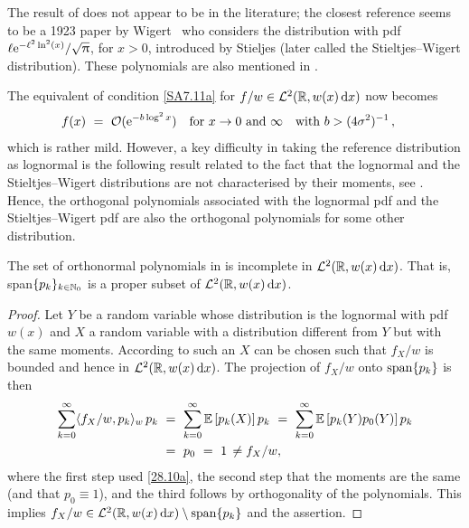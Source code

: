 \begin{remark}\label{Rem:27.10b}
The result of 
does not appear to be in the literature; the closest reference
seems to be a 1923 paper by Wigert~\cite{Wi23} who considers
the distribution with pdf
$\ell\mathrm{e}^{-\ell^{2}\ln^{2}(x)}/\sqrt{\uppi}$, for $x>0$, introduced by Stieljes \cite[pp.\ 507--508]{St1894} (later called the Stieltjes--Wigert distribution). These polynomials are also mentioned in \cite[pp.\ 172--175]{Ch11}.
\remQED \end{remark}

The equivalent of condition \eqref{SA7.11a} for $f/w\in\mathcal{L}^2(\mathbb{R}, w(x) \mathop{}\!\mathrm{d} x)$ now becomes
\begin{align}\label{SA7.11c}
f(x)\ &=\ {\mathcal{O}}(\mathrm{e}^{ -b \log^2x } )\quad\text{for }x\to 0 \text{ and } \infty \quad\text{with } b> (4\sigma^2)^{-1}\,,
\end{align}
which is rather mild. However,
a key difficulty in taking the reference distribution as lognormal is the following
result related to the fact that the lognormal and the Stieltjes--Wigert distributions are not characterised by their moments, see \cite{Heyde63,Berg1984,Ch79,Ch03}. Hence, the orthogonal polynomials associated with the lognormal pdf and the Stieltjes--Wigert pdf are also the orthogonal polynomials for some other distribution.
\begin{proposition} \label{prop:ln_incomplete} The set of orthonormal polynomials in
 is incomplete
in $\mathcal{L}^2(\mathbb{R}, w(x) \mathop{}\!\mathrm{d} x)$. That is, {\rm span}$\{p_k\}_{k \in \mathbb{N}_0}$ is a proper subset of $\mathcal{L}^2(\mathbb{R}, w(x) \mathop{}\!\mathrm{d} x)$.
\end{proposition}
\begin{proof} Let $Y$ be a random variable whose distribution is the lognormal with pdf $w(x)$
and $X$ a random variable with a distribution different from $Y$
but with the same moments. According to \cite[pp.\ 201--202]{Berg1984} such an $X$ can be
chosen such that $f_X/w$ is bounded and hence in $\mathcal{L}^2(\mathbb{R}, w(x) \mathop{}\!\mathrm{d} x)$. The projection of
$f_X/w$  onto ${\rm span}\{p_k\}$ is then
\begin{align*}\sum_{k=0}^\infty \langle f_X/w, p_k \rangle_w \, p_k\ &=\
\sum_{k=0}^\infty \operatorname{{\mathbb E}}\left[p_k(X)\right]p_k\ =\ \sum_{k=0}^\infty \operatorname{{\mathbb E}}\left[p_k(Y) p_0(Y) \right]p_k\\
&=\ p_0\ =\ 1\,\neq f_X/w,
\end{align*}
where the first step used \eqref{28.10a}, the second step that the moments are the same (and that $p_0 \equiv 1$), and the third follows by orthogonality of the polynomials.
This implies $f_X/w\in\mathcal{L}^2(\mathbb{R}, w(x) \mathop{}\!\mathrm{d} x)\setminus{\rm span}\{p_k\}$ and the assertion.
\end{proof}
%

